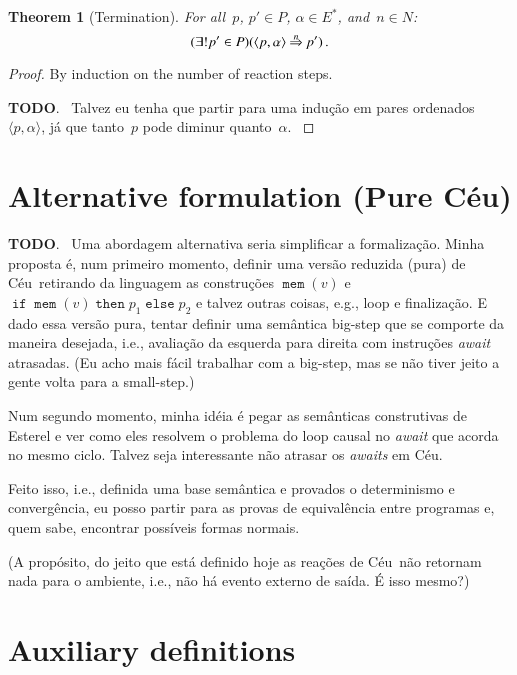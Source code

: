 \documentclass[11pt,a4paper,oneside]{amsart}
\makeatletter
\def\FIXME#1{{\color{red}{\textbf{#1}}}}
\newenvironment{TODO}
  {\bigskip\bgroup\color{red}\textbf{TODO}.~}
  {\egroup\bigskip}
\theoremstyle{plain}
\newtheorem{thm}{Theorem}
\theoremstyle{definition}
\theoremstyle{remark}
\def\Ceu{C\'eu}
\def\<#1>{\langle#1\rangle}
\def\@raise#1#2#3{
  \setbox0=\hbox{#1}%
  \mathbin{%
    \hbox to\wd0{%
      \rlap{\box0}\hfill\raise#2\hbox{$\scriptstyle{#3}$}\hfill
    }%
  }%
}
\def\eval#1{\@raise{$\Rightarrow$}{1.1ex}{#1}}
\def\@ceuop#1{\mathop{\texttt{#1}}}%
\def\@ceubin#1{\mathbin{\texttt{#1}}}%
\def\ceu#1{%
  \bgroup
  \def\Skip{\@ceuop{skip}}%
  \def\Mem{\@ceuop{mem}}%
  \def\Attr##1##2{##1=##2}%
  \def\AwaitExt{\@ceuop{awaitExt}}%
  \def\AwaitInt{\@ceuop{awaitInt}}%
  \def\Emit{\@ceuop{emit}}%
  \def\Break{\@ceuop{break}}%
  \def\Ifelse##1##2##3{%
    \@ceuop{if}%
    \@ceuop{mem}(##1)%
    \@ceuop{then}{##2}%
    \@ceuop{else}{##3}}%
  \def\Loop{\@ceuop{loop}}%
  \def\And{\;\@ceubin{and}\;}%
  \def\Or{\;\@ceubin{or}\;}%
  \def\Fin{\@ceuop{fin}}%
  \def\AwaitingExt{\@ceuop{@awaitingExt}}%
  \def\AwaitingInt{\@ceuop{@awaitingInt}}%
  \def\Emitting{\@ceuop{@emitting}}%
  \def\Atloop{\@ceuop{@loop}}%
  \def\Final{\@ceuop{$\otimes$}}%
  \def\True{\@ceuop{$\top$}}%
  \def\False{\@ceuop{$\bot$}}%
  \ensuremath{#1}\ignorespaces
  \egroup
}
\makeatother
\begin{document}
\begin{thm}[Termination]
For all~$p$, $p'\in{P}$, $\alpha\in{E^*}$, and~$n\in{N}$:
\begin{equation*}
(\exists!p'\in{P})(\<p,\alpha>\eval{n}p')\,.
\end{equation*}
\end{thm}
\begin{proof}
By induction on the number of reaction steps.  \FIXME{\dots}

\begin{TODO}
  Talvez eu tenha que partir para uma indução em pares
  ordenados~$\<p,\alpha>$, já que tanto~$p$ pode diminur quanto~$\alpha$.
\end{TODO}
\end{proof}


\section{Alternative formulation (Pure \Ceu)}
\label{Section:pure-ceu}

\begin{TODO}
Uma abordagem alternativa seria simplificar a formalização.  Minha proposta
é, num primeiro momento, definir uma versão reduzida (pura) de
\Ceu\ retirando da linguagem as construções \ceu{\Mem(v)} e
\ceu{\Ifelse{v}{p_1}{p_2}} e talvez outras coisas, e.g., loop e finalização.
E dado essa versão pura, tentar definir uma semântica big-step que se
comporte da maneira desejada, i.e., avaliação da esquerda para direita com
instruções \emph{await} atrasadas.  (Eu acho mais fácil trabalhar com a
big-step, mas se não tiver jeito a gente volta para a small-step.)

Num segundo momento, minha idéia é pegar as semânticas construtivas de
Esterel e ver como eles resolvem o problema do loop causal no \emph{await}
que acorda no mesmo ciclo.  Talvez seja interessante não atrasar os
\emph{awaits} em \Ceu.

Feito isso, i.e., definida uma base semântica e provados o determinismo e
convergência, eu posso partir para as provas de equivalência entre programas
e, quem sabe, encontrar possíveis formas normais.

(A propósito, do jeito que está definido hoje as reações de \Ceu\ não
retornam nada para o ambiente, i.e., não há evento externo de saída.  É isso
mesmo?)
\end{TODO}


\appendix
\section{Auxiliary definitions}
\label{Appendix:extra}
\end{document}
